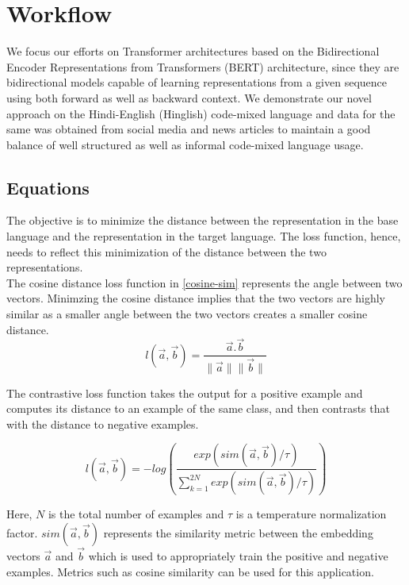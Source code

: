 \documentclass[conference]{IEEEtran}
\begin{document}
\section{Workflow}
We focus our efforts on Transformer architectures based on the Bidirectional Encoder Representations from Transformers (BERT) architecture, since they are bidirectional models capable of learning representations from a given sequence using both forward as well as backward context. We demonstrate our novel approach on the Hindi-English (Hinglish) code-mixed language and data for the same was obtained from social media and news articles to maintain a good balance of well structured as well as informal code-mixed language usage. 

\subsection{Equations}
The objective is to minimize the distance between the representation in the base language and the representation in the target language. The loss function, hence, needs to reflect this minimization of the distance between the two representations.\\

The cosine distance loss function in \eqref{cosine-sim} represents the angle between two vectors. Minimzing the cosine distance implies that the two vectors are highly similar as a smaller angle between the two vectors creates a smaller cosine distance. 
\begin{equation}
\label{cosine-sim}
    l(\overrightarrow{a}, \overrightarrow{b}) = \frac{\overrightarrow{a} . \overrightarrow{b}}{\lVert\overrightarrow{a}\rVert \lVert  \overrightarrow{b}\rVert}
\end{equation}

The contrastive loss function takes the output for a positive example and computes its distance to an example of the same class, and then contrasts that with the distance to negative examples. 

\begin{equation}
\label{contrastive}
    l(\overrightarrow{a}, \overrightarrow{b}) = -log \left ( \frac{exp(sim(\overrightarrow{a}, \overrightarrow{b})/ \tau)}{\sum\limits_{k=1}^{2N} exp(sim(\overrightarrow{a}, \overrightarrow{b})/ \tau)} \right )
\end{equation}

Here, $N$ is the total number of examples and $\tau$ is a temperature normalization factor. $sim(\overrightarrow{a}, \overrightarrow{b})$ represents the similarity metric between the embedding vectors $\overrightarrow{a}$ and $\overrightarrow{b}$ which is used to appropriately train the positive and negative examples. Metrics such as cosine similarity can be used for this application. \\
\end{document}
